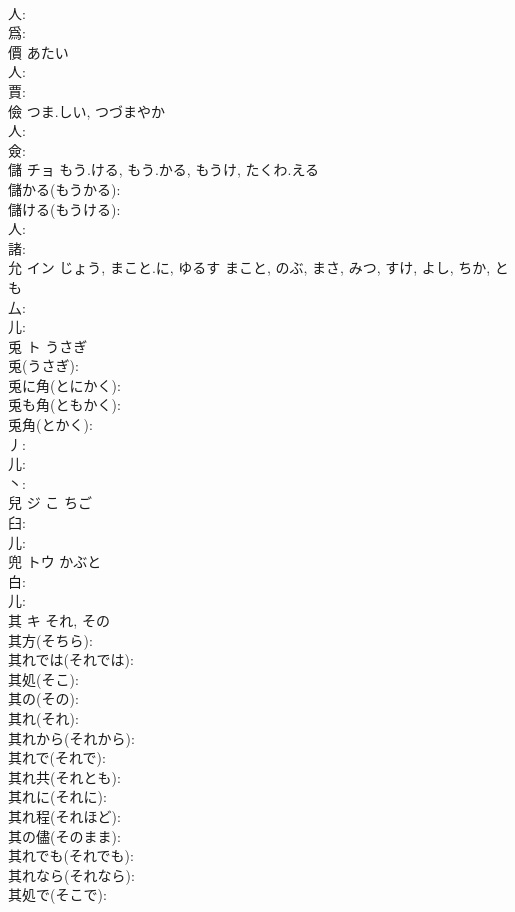\documentclass[8pt]{extreport}
\begin{document}
\begin{CJK}{UTF8}{min}
\\	人: 
\\	爲: 
\\	價		あたい				
\\	人: 
\\	賈: 
\\	儉		つま.しい, つづまやか				
\\	人: 
\\	僉: 
\\	儲	チョ	もう.ける, もう.かる, もうけ, たくわ.える		
\\	儲かる(もうかる): 
\\	儲ける(もうける): 
\\	人: 
\\	諸: 
\\	允	イン	じょう, まこと.に, ゆるす	まこと, のぶ, まさ, みつ, すけ, よし, ちか, とも	
\\	厶: 
\\	儿: 
\\	兎	ト	うさぎ		
\\	兎(うさぎ): 
\\	兎に角(とにかく): 
\\	兎も角(ともかく): 
\\	兎角(とかく): 
\\	丿: 
\\	儿: 
\\	丶: 
\\	兒	ジ	こ	ちご	
\\	臼: 
\\	儿: 
\\	兜	トウ	かぶと		
\\	白: 
\\	儿: 
\\	其	キ	それ, その		
\\	其方(そちら): 
\\	其れでは(それでは): 
\\	其処(そこ): 
\\	其の(その): 
\\	其れ(それ): 
\\	其れから(それから): 
\\	其れで(それで): 
\\	其れ共(それとも): 
\\	其れに(それに): 
\\	其れ程(それほど): 
\\	其の儘(そのまま): 
\\	其れでも(それでも): 
\\	其れなら(それなら): 
\\	其処で(そこで): 

\end{CJK}
\end{document}
